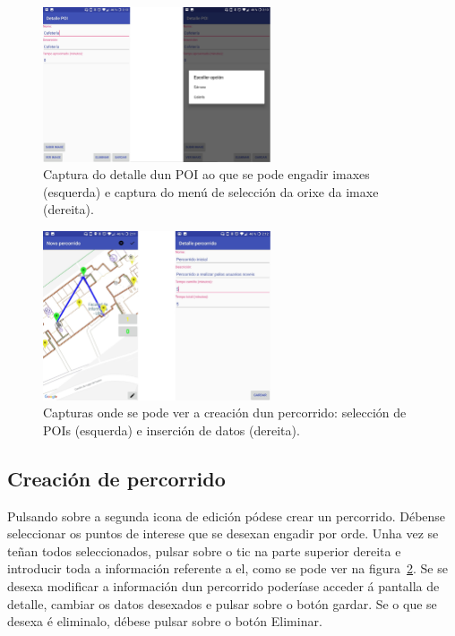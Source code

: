 \begin{figure}[H]
	\begin{center}
		\includegraphics[width=0.6\textwidth]{figures/android/mapaEngadirImaxe}
		\caption{Captura do detalle dun POI ao que se pode engadir imaxes (esquerda) e captura do menú de selección da orixe da imaxe (dereita).}
		\label{fig:mapaEngadirImaxe}
	\end{center}
\end{figure}

\begin{figure}[h]
	\begin{center}
		\includegraphics[width=0.6\textwidth]{figures/android/mapaCrearPercorrido}
		\caption{Capturas onde se pode ver a creación dun percorrido: selección de POIs (esquerda) e inserción de datos (dereita).}
		\label{fig:mapaCrearPercorrido}
	\end{center}
\end{figure}

\subsection{Creación de percorrido}
Pulsando sobre a segunda icona de edición pódese crear un percorrido. Débense seleccionar os puntos de interese que se desexan engadir por orde. Unha vez se teñan todos seleccionados, pulsar sobre o tic na parte superior dereita e introducir toda a información referente a el, como se pode ver na figura~\ref{fig:mapaCrearPercorrido}. Se se desexa modificar a información dun percorrido poderíase acceder á pantalla de detalle, cambiar os datos desexados e pulsar sobre o botón gardar. Se o que se desexa é eliminalo, débese pulsar sobre o botón Eliminar.

